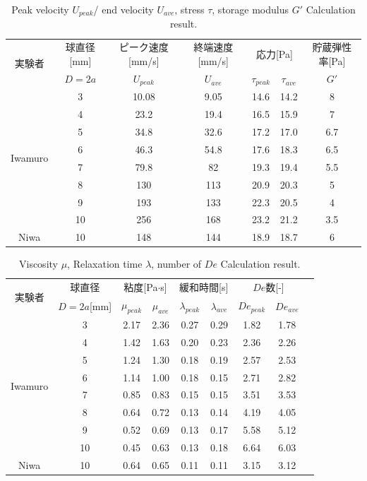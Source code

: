 \begin{table}[hbtp]
    \caption{Peak velocity $U_{peak}$/ end velocity $U_{ave}$, stress $\tau$, storage modulus $G'$ Calculation result.}
    \label{table:iwamuro}
    \centering
    \begin{tabular}{ccccccc}
      \hline
      \multirow{2}{*}{実験者} & 球直径[mm] & ピーク速度[mm/s] & 終端速度[mm/s] &\multicolumn{2}{c}{応力[Pa]} & 貯蔵弾性率[Pa] \\
       & $D=2a$ & $U_{peak}$ & $U_{ave}$ &  $\tau_{peak}$ & $\tau_{ave}$ & $G'$\\
      \hline \hline
      \multirow{8}{*}{Iwamuro} & 3  & 10.08 & 9.05 & 14.6 & 14.2 & 8\\
      & 4  & 23.2 & 19.4 & 16.5 & 15.9 & 7\\
      & 5  & 34.8 & 32.6 & 17.2 & 17.0 & 6.7 \\
      & 6  & 46.3 & 54.8 & 17.6 & 18.3 & 6.5\\
      & 7  & 79.8 & 82 & 19.3 & 19.4 & 5.5\\
      & 8  & 130 & 113 & 20.9 & 20.3 & 5 \\
      & 9  & 193 & 133 & 22.3 & 20.5 & 4\\
      & 10 & 256 & 168 & 23.2 & 21.2 & 3.5\\
      \hline \hline
      Niwa & 10 & 148 & 144 & 18.9 & 18.7 & 6 \\
      \hline
    \end{tabular}
\end{table}
\begin{table}[hbtp]
    \caption{Viscosity $\mu$, Relaxation time $\lambda$, number of $De$ Calculation result.}
    \label{table:iwamuro2}
    \centering
    \begin{tabular}{ccccccccc}
      \hline
      \multirow{2}{*}{実験者} & 球直径 &\multicolumn{2}{c}{粘度[Pa$\cdot$s]} &\multicolumn{2}{c}{緩和時間[s]}  &\multicolumn{2}{c}{$De$数[-]} \\
       & $D=2a$[mm] & $\mu_{peak}$ & $\mu_{ave}$  &  $\lambda_{peak}$ & $\lambda_{ave}$ & $De_{peak}$ & $De_{ave}$ \\
      \hline \hline
      \multirow{8}{*}{Iwamuro} & 3  & 2.17 & 2.36 & 0.27 & 0.29 & 1.82 & 1.78\\
      & 4  & 1.42 & 1.63 & 0.20 & 0.23 & 2.36 & 2.26\\
      & 5  & 1.24 & 1.30 & 0.18 & 0.19 & 2.57 & 2.53 \\
      & 6  & 1.14 & 1.00 & 0.18 & 0.15 & 2.71 & 2.82\\
      & 7  & 0.85 & 0.83 & 0.15 & 0.15 & 3.51 & 3.53\\
      & 8  & 0.64 & 0.72 & 0.13 & 0.14 & 4.19 & 4.05 \\
      & 9  & 0.52 & 0.69 & 0.13 & 0.17 & 5.58 & 5.12\\
      & 10 & 0.45 & 0.63 & 0.13 & 0.18 & 6.64 & 6.03\\
      \hline \hline
      Niwa & 10 & 0.64 & 0.65 & 0.11 & 0.11 & 3.15 & 3.12 \\
      \hline
    \end{tabular}
\end{table}


